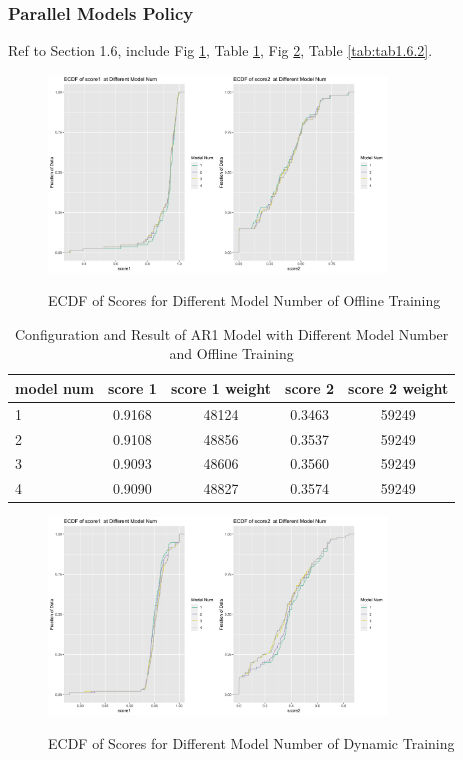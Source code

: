 \documentclass{article}
\begin{document}
\subsubsection{Parallel Models Policy}
Ref to Section 1.6, include Fig \ref{fig:fig1.6.1}, Table \ref{tab:tab1.6.1}, Fig \ref{fig:fig1.6.2}, Table \ref{tab:tab1.6.2}.

\begin{figure}
    \caption{ECDF of Scores for Different Model Number of Offline Training}
    \centering
    \includegraphics[width = 0.8\textwidth]{images/ECDFofscoresatDifferentModelNumOfAR1,840,3,offline.png}
    \label{fig:fig1.6.1}
\end{figure}

\begin{table}[htbp]
  \begin{center}
    \caption{Configuration and Result of AR1 Model with Different Model Number and Offline Training}
    \label{tab:tab1.6.1}
    \begin{tabular}{l|*{4}{c}}
      \textbf{model num} & \textbf{score 1} & \textbf{score 1 weight} & \textbf{score 2} & \textbf{score 2 weight} \\
      \hline
      1 & 0.9168 & 48124 & 0.3463 & 59249\\
      2 & 0.9108 & 48856 & 0.3537 & 59249\\
      3 & 0.9093 & 48606 & 0.3560 & 59249\\
      4 & 0.9090 & 48827 & 0.3574 & 59249\\
    \end{tabular}
  \end{center}
\end{table}

\begin{figure}
    \caption{ECDF of Scores for Different Model Number of Dynamic Training}
    \centering
    \includegraphics[width = 0.8\textwidth]{images/ECDFofscoresatDifferentModelNumOfAR1,840,3,dynamic.png}
    \label{fig:fig1.6.2}
\end{figure}
\end{document}
